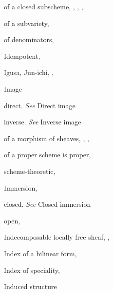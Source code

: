 {{\noindent\hspace*{7.5bp}of a closed subscheme, , , , \par
\noindent\hspace*{7.5bp}of a subvariety, \par
\noindent\hspace*{7.5bp}of denominators, \par
\noindent\hspace*{0.0bp}Idempotent, \par
\noindent\hspace*{0.0bp}Igusa, Jun-ichi, , \par
\noindent\hspace*{0.0bp}Image\par
\noindent\hspace*{7.5bp}direct. \emph{See} Direct image\par
\noindent\hspace*{7.5bp}inverse. \emph{See} Inverse image\par
\noindent\hspace*{7.5bp}of a morphism of sheaves, , , \par
\noindent\hspace*{7.5bp}of a proper scheme is proper, \par
\noindent\hspace*{7.5bp}scheme-theoretic, \par
\noindent\hspace*{0.0bp}Immersion, \par
\noindent\hspace*{7.5bp}closed. \emph{See} Closed immersion\par
\noindent\hspace*{7.5bp}open, \par
\noindent\hspace*{0.0bp}Indecomposable locally free sheaf, , \par
\noindent\hspace*{0.0bp}Index of a bilinear form, \par
\noindent\hspace*{0.0bp}Index of speciality, \par
\noindent\hspace*{0.0bp}Induced structure\par
}}
